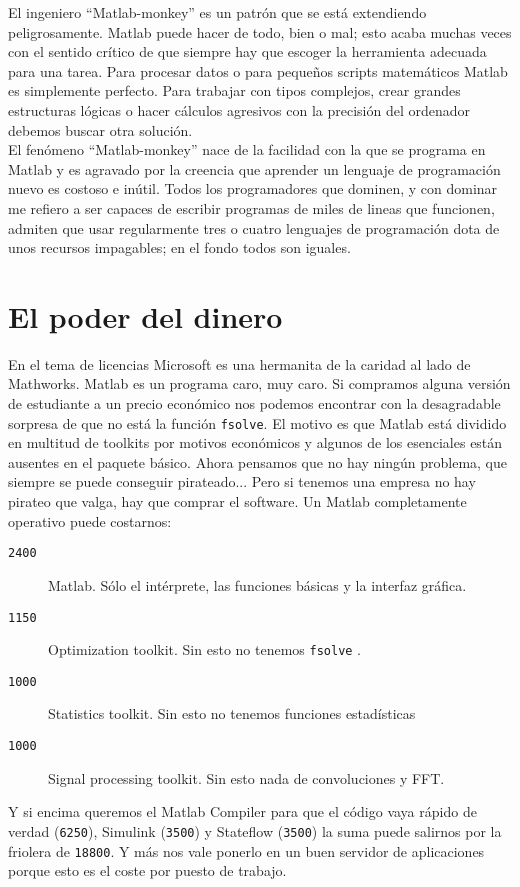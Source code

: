 El ingeniero {}``Matlab-monkey'' es un patrón que se está extendiendo
peligrosamente. Matlab puede hacer de todo, bien o mal; esto acaba
muchas veces con el sentido crítico de que siempre hay que escoger
la herramienta adecuada para una tarea. Para procesar datos o para
pequeños scripts matemáticos Matlab es simplemente perfecto. Para
trabajar con tipos complejos, crear grandes estructuras lógicas o
hacer cálculos agresivos con la precisión del ordenador debemos buscar
otra solución.\\

El fenómeno {}``Matlab-monkey'' nace de la facilidad con la que
se programa en Matlab y es agravado por la creencia que aprender un
lenguaje de programación nuevo es costoso e inútil. Todos los programadores
que dominen, y con dominar me refiero a ser capaces de escribir programas
de miles de lineas que funcionen, admiten que usar regularmente tres
o cuatro lenguajes de programación dota de unos recursos impagables;
en el fondo todos son iguales.


\section{El poder del dinero}

En el tema de licencias Microsoft es una hermanita de la caridad al
lado de Mathworks. Matlab es un programa caro, muy caro. Si compramos
alguna versión de estudiante a un precio económico nos podemos encontrar
con la desagradable sorpresa de que no está la función \texttt{fsolve}.
El motivo es que Matlab está dividido en multitud de toolkits por
motivos económicos y algunos de los esenciales están ausentes en el
paquete básico. Ahora pensamos que no hay ningún problema, que siempre
se puede conseguir pirateado... Pero si tenemos una empresa no hay
pirateo que valga, hay que comprar el software. Un Matlab completamente
operativo puede costarnos:

\begin{description}
\item [\texttt{2400\EUR}]Matlab. Sólo el intérprete, las funciones
  básicas y la interfaz gráfica.
\item [\texttt{1150\EUR}]Optimization toolkit. Sin esto no tenemos
  \texttt{fsolve} .
\item [\texttt{1000\EUR}]Statistics toolkit. Sin esto no tenemos
  funciones estadísticas
\item [\texttt{1000\EUR}]Signal processing toolkit. Sin esto nada de
  convoluciones y FFT.
\end{description}
Y si encima queremos el Matlab Compiler para que el código vaya rápido
de verdad (\texttt{6250}\EUR), Simulink (\texttt{3500}\EUR) y
Stateflow (\texttt{3500}\EUR) la suma puede salirnos por la friolera
de \texttt{18800}\EUR.  Y más nos vale ponerlo en un buen servidor de
aplicaciones porque esto es el coste por puesto de trabajo.\\

